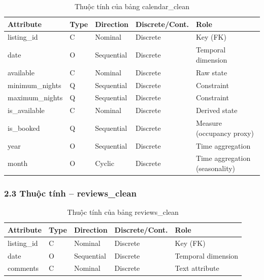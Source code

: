 \begin{table}[htbp]
\centering
\caption{Thuộc tính của bảng calendar\_clean}
\begin{tabularx}{\textwidth}{@{} l l l l X @{}}
\toprule
\textbf{Attribute} & \textbf{Type} & \textbf{Direction} & \textbf{Discrete/Cont.} & \textbf{Role} \\
\midrule
listing\_id     & C & Nominal    & Discrete & Key (FK) \\ \hline
date            & O & Sequential & Discrete & Temporal dimension \\ \hline
available       & C & Nominal    & Discrete & Raw state \\ \hline
minimum\_nights & Q & Sequential & Discrete & Constraint \\ \hline
maximum\_nights & Q & Sequential & Discrete & Constraint \\ \hline
is\_available   & C & Nominal    & Discrete & Derived state \\ \hline
is\_booked      & Q & Sequential & Discrete & Measure (occupancy proxy) \\ \hline
year            & O & Sequential & Discrete & Time aggregation \\ \hline
month           & O & Cyclic     & Discrete & Time aggregation (seasonality) \\ 
\bottomrule
\end{tabularx}
\end{table}

\subsubsection*{2.3 Thuộc tính -- reviews\_clean}

\begin{table}[htbp]
\centering
\caption{Thuộc tính của bảng reviews\_clean}
\begin{tabular}{@{} l l l l l @{}}
\toprule
\textbf{Attribute} & \textbf{Type} & \textbf{Direction} & \textbf{Discrete/Cont.} & \textbf{Role} \\
\midrule
listing\_id & C & Nominal    & Discrete & Key (FK) \\ \hline
date        & O & Sequential & Discrete & Temporal dimension \\ \hline
comments    & C & Nominal    & Discrete & Text attribute \\ 
\bottomrule
\end{tabular}
\end{table}

